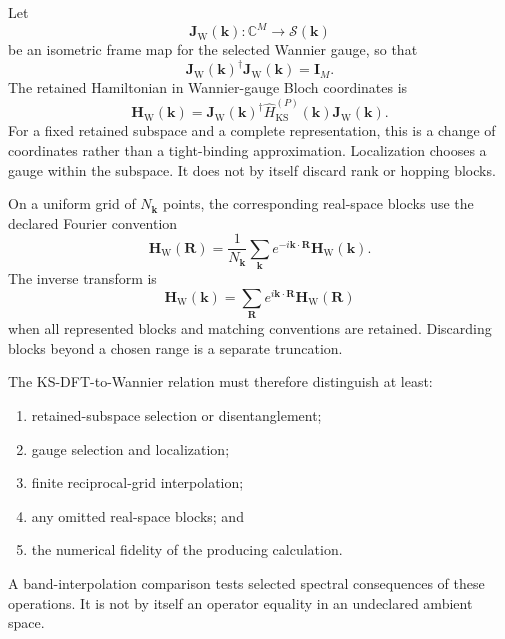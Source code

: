 Let
\begin{equation}
    \mathbf J_{\mathrm W}(\mathbf k):
    \mathbb C^M
    \longrightarrow
    \mathcal S(\mathbf k)
\end{equation}
be an isometric frame map for the selected Wannier gauge, so that
\begin{equation}
    \mathbf J_{\mathrm W}(\mathbf k)^\dagger
    \mathbf J_{\mathrm W}(\mathbf k)
    =
    \mathbf I_M.
\end{equation}
The retained Hamiltonian in Wannier-gauge Bloch coordinates is
\begin{equation}
    \mathbf H_{\mathrm W}(\mathbf k)
    =
    \mathbf J_{\mathrm W}(\mathbf k)^\dagger
    \hat H_{\mathrm{KS}}^{(P)}(\mathbf k)
    \mathbf J_{\mathrm W}(\mathbf k).
\end{equation}
For a fixed retained subspace and a complete representation, this is a change
of coordinates rather than a tight-binding approximation. Localization chooses
a gauge within the subspace. It does not by itself discard rank or hopping
blocks.

On a uniform grid of $N_{\mathbf k}$ points, the corresponding real-space
blocks use the declared Fourier convention
\begin{equation}
    \mathbf H_{\mathrm W}(\mathbf R)
    =
    \frac{1}{N_{\mathbf k}}
    \sum_{\mathbf k}
    e^{-i\mathbf k\cdot\mathbf R}
    \mathbf H_{\mathrm W}(\mathbf k).
\end{equation}
The inverse transform is
\begin{equation}
    \mathbf H_{\mathrm W}(\mathbf k)
    =
    \sum_{\mathbf R}
    e^{i\mathbf k\cdot\mathbf R}
    \mathbf H_{\mathrm W}(\mathbf R)
\end{equation}
when all represented blocks and matching conventions are retained. Discarding
blocks beyond a chosen range is a separate truncation.

The KS-DFT-to-Wannier relation must therefore distinguish at least:
\begin{enumerate}
    \item retained-subspace selection or disentanglement;
    \item gauge selection and localization;
    \item finite reciprocal-grid interpolation;
    \item any omitted real-space blocks; and
    \item the numerical fidelity of the producing calculation.
\end{enumerate}
A band-interpolation comparison tests selected spectral consequences of these
operations. It is not by itself an operator equality in an undeclared ambient
space.

